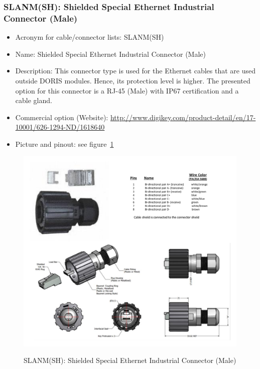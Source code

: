 \subsubsection{SLANM(SH): Shielded Special Ethernet Industrial Connector (Male)} \label{DEVICE:SLANM(SH)}
\begin{itemize}
  \item Acronym for cable/connector lists: SLANM(SH)
  \item Name: Shielded Special Ethernet Industrial Connector (Male)
  \item Description: This connector type is used for the Ethernet cables that are used outside DORIS modules. Hence, its protection level is higher. The presented option for this connector is a RJ-45 (Male) with IP67 certification and a cable gland.
  \item Commercial option (Website): \href{http://www.digikey.com/product-detail/en/17-10001/626-1294-ND/1618640}{http://www.digikey.com/product-detail/en/17-10001/626-1294-ND/1618640}
  \item Picture and pinout: see figure~\ref{FIG:DEVICESLANM(SH)}
\end{itemize}
\begin{figure}
  \centering
  \includegraphics[angle=90,width=1\columnwidth]{figs/body02/FIGDEVICESLANM(SH).pdf}\\
  \caption[SLANM(SH): Shielded Special Ethernet Industrial Connector (Male)]{SLANM(SH): Shielded Special Ethernet Industrial Connector (Male)}
  \label{FIG:DEVICESLANM(SH)}
\end{figure}
